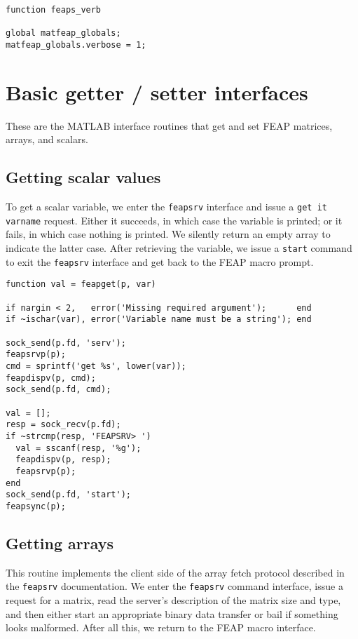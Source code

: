 \begin{verbatim}
function feaps_verb

global matfeap_globals;
matfeap_globals.verbose = 1;
\end{verbatim}
\section {Basic getter / setter interfaces}

These are the MATLAB interface routines that get and set FEAP
matrices, arrays, and scalars.

\subsection{Getting scalar values}

To get a scalar variable, we enter the {\tt feapsrv} interface
and issue a {\tt get {it varname}} request.  Either it succeeds,
in which case the variable is printed; or it fails, in which case
nothing is printed.  We silently return an empty array to
indicate the latter case.  After retrieving the variable, we
issue a {\tt start} command to exit the {\tt feapsrv} interface
and get back to the FEAP macro prompt.

\begin{verbatim}
function val = feapget(p, var)

if nargin < 2,   error('Missing required argument');      end
if ~ischar(var), error('Variable name must be a string'); end

sock_send(p.fd, 'serv');
feapsrvp(p);
cmd = sprintf('get %s', lower(var));
feapdispv(p, cmd);
sock_send(p.fd, cmd);

val = [];
resp = sock_recv(p.fd);
if ~strcmp(resp, 'FEAPSRV> ')
  val = sscanf(resp, '%g');
  feapdispv(p, resp);
  feapsrvp(p);
end
sock_send(p.fd, 'start');
feapsync(p);
\end{verbatim}
\subsection{Getting arrays}

This routine implements the client side of the array fetch
protocol described in the {\tt feapsrv} documentation.  We enter
the {\tt feapsrv} command interface, issue a request for a
matrix, read the server's description of the matrix size and
type, and then either start an appropriate binary data transfer
or bail if something looks malformed.  After all this, we return
to the FEAP macro interface.

